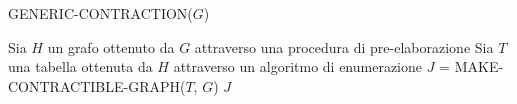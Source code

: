 \begin{algorithm}[H] 
    \caption{GENERIC-CONTRACTION($G$)}\label{alg:generic-contraction}
    \begin{algorithmic}[1]
        \State Sia $H$ un grafo ottenuto da $G$ attraverso una procedura di pre-elaborazione
        \State Sia $T$ una tabella ottenuta da $H$ attraverso un algoritmo di enumerazione
        \State $J$ = MAKE-CONTRACTIBLE-GRAPH($T$, $G$)
        \State \Return $J$
    \end{algorithmic}
\end{algorithm}